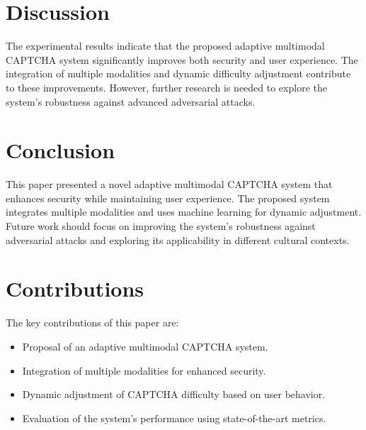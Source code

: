 \documentclass{article}
\begin{document}
\section{Discussion}
\label{sec:discussion}

The experimental results indicate that the proposed adaptive multimodal CAPTCHA system significantly improves both security and user experience. The integration of multiple modalities and dynamic difficulty adjustment contribute to these improvements. However, further research is needed to explore the system's robustness against advanced adversarial attacks.

\section{Conclusion}
\label{sec:conclusion}

This paper presented a novel adaptive multimodal CAPTCHA system that enhances security while maintaining user experience. The proposed system integrates multiple modalities and uses machine learning for dynamic adjustment. Future work should focus on improving the system's robustness against adversarial attacks and exploring its applicability in different cultural contexts.

\section{Contributions}
\label{sec:contributions}

The key contributions of this paper are:
\begin{itemize}
    \item Proposal of an adaptive multimodal CAPTCHA system.
    \item Integration of multiple modalities for enhanced security.
    \item Dynamic adjustment of CAPTCHA difficulty based on user behavior.
    \item Evaluation of the system's performance using state-of-the-art metrics.
\end{itemize}

\printbibliography
\end{document}

